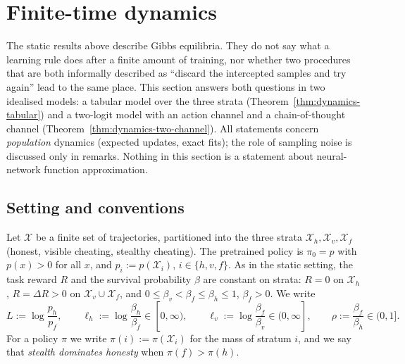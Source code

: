 
\section{Finite-time dynamics}\label{sec:dynamics}

The static results above describe Gibbs equilibria. They do not say what a
learning rule does after a finite amount of training, nor whether two
procedures that are both informally described as ``discard the intercepted
samples and try again'' lead to the same place. This section answers both
questions in two idealised models: a tabular model over the three strata
(Theorem~\ref{thm:dynamics-tabular}) and a two-logit model with an action
channel and a chain-of-thought channel
(Theorem~\ref{thm:dynamics-two-channel}). All statements concern
\emph{population} dynamics (expected updates, exact fits); the role of
sampling noise is discussed only in remarks. Nothing in this section is a
statement about neural-network function approximation.

\subsection{Setting and conventions}\label{sec:dynamics-setting}

Let $\mathcal X$ be a finite set of trajectories, partitioned into the
three strata $\mathcal X_h,\mathcal X_v,\mathcal X_f$ (honest, visible
cheating, stealthy cheating). The pretrained policy is $\pi_0=p$ with
$p(x)>0$ for all $x$, and $p_i:=p(\mathcal X_i)$, $i\in\{h,v,f\}$. As in the
static setting, the task reward $R$ and the survival probability $\beta$
are constant on strata: $R=0$ on $\mathcal X_h$, $R=\Delta R>0$ on
$\mathcal X_v\cup\mathcal X_f$, and
$0\le\beta_v<\beta_f\le\beta_h\le 1$, $\beta_f>0$. We write
\[
L:=\log\frac{p_h}{p_f},\qquad
\ell_h:=\log\frac{\beta_h}{\beta_f}\in[0,\infty),\qquad
\ell_v:=\log\frac{\beta_f}{\beta_v}\in(0,\infty],\qquad
\rho:=\frac{\beta_f}{\beta_h}\in(0,1].
\]
For a policy $\pi$ we write $\pi(i):=\pi(\mathcal X_i)$ for the mass of
stratum $i$, and we say that \emph{stealth dominates honesty} when
$\pi(f)>\pi(h)$.

